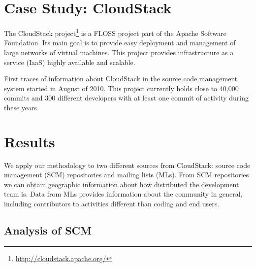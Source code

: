\documentclass{sig-alternate-05-2015}
\begin{document}
\section{Case Study: CloudStack}
\label{sec:case-study}

The CloudStack project\footnote{\url{http://cloudstack.apache.org/}}
is a FLOSS project part of the Apache
Software Foundation. Its main goal is to provide easy deployment
and management of large networks of virtual machines. This project
provides infrastructure as a service (IaaS) highly available
and scalable.

First traces of information about CloudStack in the source code
management system started in August of 2010. This project currently
holds close to 40,000 commits and 300 different developers
with at least one commit of activity during these years.




\section{Results}
\label{sec:results}

We apply our methodology to two different
sources from CloudStack: source code management (SCM) repositories and mailing lists (MLs). From
SCM repositories we can obtain geographic information about
how distributed the development team is. Data from MLs provides
information about the community in general, including contributors to 
activities different than coding and end users.

\subsection{Analysis of SCM}

\end{document}
